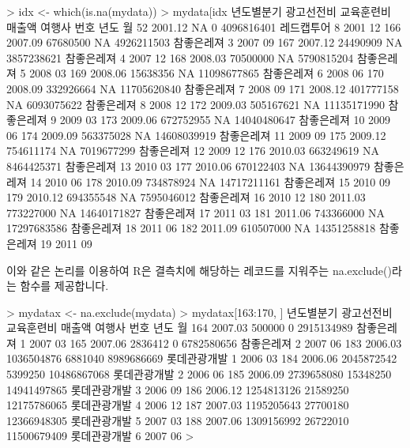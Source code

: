 \begin{Schunk}
\begin{Soutput}
> idx <- which(is.na(mydata))
> mydata[idx%%nrow(mydata), ]
    년도별분기 광고선전비 교육훈련비      매출액     여행사 번호 년도 월
52     2001.12         NA          0  4096816401 레드캡투어    8 2001 12
166    2007.09   67680500         NA  4926211503 참좋은레져    3 2007 09
167    2007.12   24490909         NA  3857238621 참좋은레져    4 2007 12
168    2008.03   70500000         NA  5790815204 참좋은레져    5 2008 03
169    2008.06   15638356         NA 11098677865 참좋은레져    6 2008 06
170    2008.09  332926664         NA 11705620840 참좋은레져    7 2008 09
171    2008.12  401777158         NA  6093075622 참좋은레져    8 2008 12
172    2009.03  505167621         NA 11135171990 참좋은레져    9 2009 03
173    2009.06  672752955         NA 14040480647 참좋은레져   10 2009 06
174    2009.09  563375028         NA 14608039919 참좋은레져   11 2009 09
175    2009.12  754611174         NA  7019677299 참좋은레져   12 2009 12
176    2010.03  663249619         NA  8464425371 참좋은레져   13 2010 03
177    2010.06  670122403         NA 13644390979 참좋은레져   14 2010 06
178    2010.09  734878924         NA 14717211161 참좋은레져   15 2010 09
179    2010.12  694355548         NA  7595046012 참좋은레져   16 2010 12
180    2011.03  773227000         NA 14640171827 참좋은레져   17 2011 03
181    2011.06  743366000         NA 17297683586 참좋은레져   18 2011 06
182    2011.09  610507000         NA 14351258818 참좋은레져   19 2011 09
\end{Soutput}
\end{Schunk}

이와 같은 논리를 이용하여 R은 결측치에 해당하는 레코드를 지워주는 na.exclude()라는 함수를 제공합니다. 

\begin{Schunk}
\begin{Soutput}
> mydatax <- na.exclude(mydata)
> mydatax[163:170, ]
    년도별분기 광고선전비 교육훈련비      매출액       여행사 번호 년도 월
164    2007.03     500000          0  2915134989   참좋은레져    1 2007 03
165    2007.06    2836412          0  6782580656   참좋은레져    2 2007 06
183    2006.03 1036504876    6881040  8989686669 롯데관광개발    1 2006 03
184    2006.06 2045872542    5399250 10486867068 롯데관광개발    2 2006 06
185    2006.09 2739658080   15348250 14941497865 롯데관광개발    3 2006 09
186    2006.12 1254813126   21589250 12175786065 롯데관광개발    4 2006 12
187    2007.03 1195205643   27700180 12366948305 롯데관광개발    5 2007 03
188    2007.06 1309156992   26722010 11500679409 롯데관광개발    6 2007 06
> 
\end{Soutput}
\end{Schunk}

